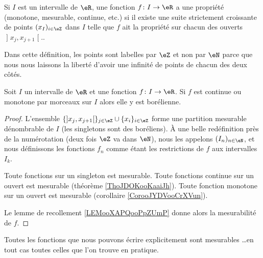 \begin{definition}
Si \( I\) est un intervalle de \( \eR\), une fonction \( f\colon I\to \eR\) a une propriété (monotone, mesurable, continue, etc.)  si il existe une suite strictement croissante de points \( (x_I)_{i\in \eZ}\) dans \( I\) telle que \( f\) ait la propriété sur chacun des ouverts \( \mathopen] x_j ,x_{j+1} \mathclose[.\).
\end{definition}
Dans cette définition, les points sont labelles par \( \eZ\) et non par \( \eN\) parce que nous nous laissons la liberté d'avoir une infinité de points de chacun des deux côtés.

\begin{proposition}     \label{PropooLNBHooBHAWiD}
    Soit \( I\) un intervalle de \( \eR\) et une fonction \( f\colon I\to \eR\). Si \( f\) est continue ou monotone par morceaux sur \( I\) alors elle y est borélienne.
\end{proposition}

\begin{proof}
L'ensemble \( \{  \mathopen] x_j , x_{j+1} \mathclose[  \}_{j\in \eZ}\cup\{ x_i \}_{i\in \eZ}\) forme une partition mesurable dénombrable de \( I\) (les singletons sont des boréliens). À une belle redéfinition près de la numérotation (deux fois \( \eZ\) va dans \( \eN\)), nous les appelons \( (I_n)_{n\in \eN}\), et nous définissons les fonctions \( f_n\) comme étant les restrictions de \( f\) aux intervalles \( I_k\).

    Toute fonctions sur un singleton est mesurable. Toute fonctions continue sur un ouvert est mesurable (théorème \ref{ThoJDOKooKaaiJh}). Toute fonction monotone sur un ouvert est mesurable (corollaire \ref{CorooJYDVooCrXVun}).

    Le lemme de recollement \ref{LEMooXAPQooPpZUmP} donne alors la mesurabilité de \( f\).
\end{proof}

\begin{normaltext}
    Toutes les fonctions que nous pouvons écrire explicitement sont mesurables \ldots en tout cas toutes celles que l'on trouve en pratique.
\end{normaltext}
